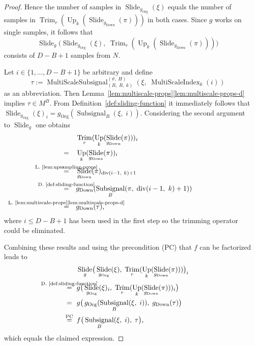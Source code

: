 \documentclass[journal]{IEEEtran}
\newcommand{\ROI}{B}
\newcommand{\discint}[2]{\{#1,\dotsc,#2\}}
\newcommand{\inint}[2]{\in\discint{#1}{#2}}
\DeclareMathOperator{\Subsignal}{Subsignal}
\DeclareMathOperator{\Slide}{Slide}
\DeclareMathOperator{\Trimming}{Trim}
\renewcommand{\div}[2]{\operatorname{div}(#1,\ #2)}
\newcommand{\equsing}[1]{\overset{\mathclap{\text{#1}}}{=}}
\DeclareMathOperator{\Downsampling}{Down}
\DeclareMathOperator{\Upsampling}{Up}
\DeclareMathOperator{\MultiScaleSubsignal}{MultiScaleSubsignal}
\newcommand{\MultiScaleSubsignalROIParams}{\MultiScaleSubsignal_{(\ROI,\; R,\; k)}^{(\vartheta,\; H)}}
\DeclareMathOperator{\MultiScaleIndex}{MultiScaleIndex}
\DeclareMathOperator{\Original}{Org}
\begin{document}
\begin{proof}
Hence the number of samples in $\Slide_{g_{\Original}}(\xi)$ equals the number of samples in $\Trimming_{r}(\Upsampling_k(\Slide_{g_{\Downsampling}}(\pi)))$ in both cases.
Since $g$ works on single samples, it follows that
\begin{displaymath}
  \Slide_g\!\big(\Slide_{g_{\Original}}(\xi),\; \Trimming_{r}(\Upsampling_k(\Slide_{g_{\Downsampling}}(\pi)))\big)
\end{displaymath}
consists of $D - \ROI + 1$ samples from $N$.

Let $i\inint{1}{D - \ROI + 1}$ be arbitrary and define
\begin{displaymath}
  \tau := \MultiScaleSubsignalROIParams(\xi,\;\MultiScaleIndex_k(i))
\end{displaymath}
as an abbreviation.
Then Lemma~\ref{lem:multiscale-props}\ref{lem:multiscale-props-d} implies $\tau\in M^\ROI$.
From Definition~\ref{def:sliding-function} it immediately follows that $\Slide_{g_{\Original}}(\xi)_i = g_{\Original}(\Subsignal_\ROI(\xi,\;i))$.
Considering the second argument to $\Slide_g$ one obtains
\begin{align*}
  &\Trimming_{r}(\Upsampling_k(\Slide_{g_{\Downsampling}}(\pi)))_i\\
  =\ \ \ &\Upsampling_k(\Slide_{g_{\Downsampling}}(\pi))_i\\
  \equsing{L.~\ref{lem:upsampling-props}}\ \ \ &\Slide_{g_{\Downsampling}}(\pi)_{\div{i - 1}{k} + 1}\\
  \equsing{D.~\ref{def:sliding-function}}\ \ \ &g_{\Downsampling}(\Subsignal_\ROI(\pi,\;\div{i - 1}{k} + 1))\\
  \equsing{L.~\ref{lem:multiscale-props}\ref{lem:multiscale-props-d}}\ \ \ &g_{\Downsampling}(\tau)\text{,}
\end{align*}
where $i\leq D - \ROI + 1$ has been used in the first step so the trimming operator could be eliminated.

Combining these results and using the precondition (PC) that $f$ can be factorized leads to
\begin{align*}
  &\Slide_g\!\big(\Slide_{g_{\Original}}(\xi),\;\Trimming_{r}(\Upsampling_k(\Slide_{g_{\Downsampling}}(\pi)))\big)_i\\
  \equsing{D.~\ref{def:sliding-function}}\ \ &g\big(\Slide_{g_{\Original}}(\xi)_i,\;\Trimming_{r}(\Upsampling_k(\Slide_{g_{\Downsampling}}(\pi)))_i\big)\\
  =\ \ &g\big(\,g_{\Original}(\Subsignal_\ROI(\xi,\;i)),\;g_{\Downsampling}(\tau)\big)\\
  \equsing{PC}\ \ &f\big(\Subsignal_\ROI(\xi,\;i),\;\tau\big)\text{,}
\end{align*}
which equals the claimed expression.
\end{proof}
\end{document}
